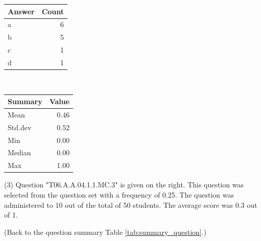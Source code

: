 \documentclass[12pt,english,nohyper]{tufte-handout}\usepackage[]{graphicx}\usepackage[]{color}
\begin{document}
\begin{center}%
\begin{tabular}{lr}
  \hline
Answer & Count \\ 
  \hline
a &   6 \\ 
  b &   5 \\ 
  c &   1 \\ 
  d &   1 \\ 
   \hline
\end{tabular}
~~~~~~~~%
\begin{tabular}{lr}
  \hline
Summary & Value \\ 
  \hline
Mean & 0.46 \\ 
  Std.dev & 0.52 \\ 
  Min & 0.00 \\ 
  Median & 0.00 \\ 
  Max & 1.00 \\ 
   \hline
\end{tabular}
\end{center}\newpage{} (3) Question "T06.A.A.04.1.1.MC.3" is given on the right. This question was selected from the question set with a frequency of 0.25. The question was administered to 10 out of the total of 50 students. The average score was 0.3 out of 1.

 (Back to the question summary Table \ref{tab:summary_question}.)
\end{document}
